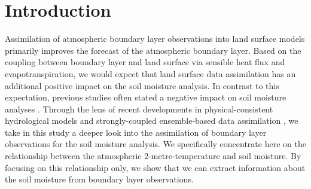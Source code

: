 \documentclass[hess, manuscript]{copernicus}
\begin{document}
%
\section{Introduction}
Assimilation of atmospheric boundary layer observations into land surface models primarily improves the forecast of the atmospheric boundary layer.
Based on the coupling between boundary layer and land surface via sensible heat flux and evapotranspiration, we would expect that land surface data assimilation has an additional positive impact on the soil moisture analysis.
In contrast to this expectation, previous studies often stated a negative impact on soil moisture analyses \citep{hess_assimilation_2001, drusch_assimilation_2007, munozsabater_assimilation_2019, draper_root_2011, su_evaluation_2013, carrera_assimilation_2019}.
Through the lens of recent developments in physical-consistent hydrological models \citep{fatichi_overview_2016,prein_review_2015,vereecken_modeling_2016} and strongly-coupled ensemble-based data assimilation \citep{sluka_assimilating_2016,penny_coupled_2017}, we take in this study a deeper look into the assimilation of boundary layer observations for the soil moisture analysis.
We specifically concentrate here on the relationship between the atmospheric 2-metre-temperature and soil moisture.
By focusing on this relationship only, we show that we can extract information about the soil moisture from boundary layer observations.
\end{document}
